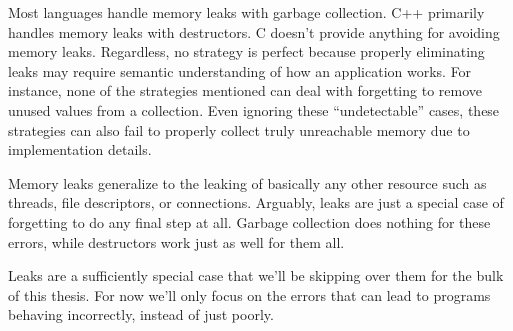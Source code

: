 Most languages handle memory leaks with garbage collection. C++ primarily
handles memory leaks with destructors. C doesn't provide anything for avoiding
memory leaks. Regardless, no strategy is perfect because properly eliminating
leaks may require semantic understanding of how an application works. For
instance, none of the strategies mentioned can deal with forgetting to remove
unused values from a collection. Even ignoring these ``undetectable'' cases,
these strategies can also fail to properly collect truly unreachable memory
due to implementation details.

Memory leaks generalize to the leaking of basically any other resource such
as threads, file descriptors, or connections. Arguably, leaks are just a special
case of forgetting to do any final step at all. Garbage collection does nothing
for these errors, while destructors work just as well for them all.

Leaks are a sufficiently special case that we'll be skipping over them for
the bulk of this thesis. For now we'll only focus on the errors that can lead
to programs behaving incorrectly, instead of just poorly.
